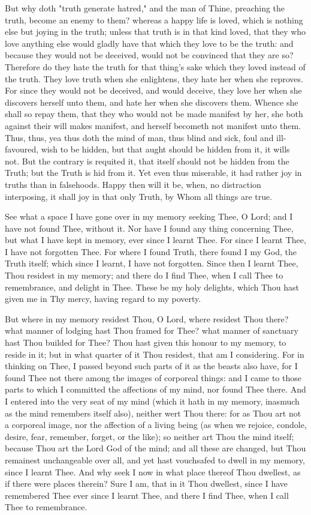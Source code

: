 \documentclass[b5paper,openright,12pt,twoside]{book}
\begin{document}
But why doth "truth generate hatred," and the man of Thine, preaching
the truth, become an enemy to them? whereas a happy life is loved, which
is nothing else but joying in the truth; unless that truth is in that
kind loved, that they who love anything else would gladly have that
which they love to be the truth: and because they would not be deceived,
would not be convinced that they are so? Therefore do they hate the
truth for that thing's sake which they loved instead of the truth. They
love truth when she enlightens, they hate her when she reproves. For
since they would not be deceived, and would deceive, they love her when
she discovers herself unto them, and hate her when she discovers them.
Whence she shall so repay them, that they who would not be made manifest
by her, she both against their will makes manifest, and herself becometh
not manifest unto them. Thus, thus, yea thus doth the mind of man, thus
blind and sick, foul and ill-favoured, wish to be hidden, but that aught
should be hidden from it, it wills not. But the contrary is requited it,
that itself should not be hidden from the Truth; but the Truth is hid
from it. Yet even thus miserable, it had rather joy in truths than in
falsehoods. Happy then will it be, when, no distraction interposing, it
shall joy in that only Truth, by Whom all things are true.

See what a space I have gone over in my memory seeking Thee, O Lord; and
I have not found Thee, without it. Nor have I found any thing concerning
Thee, but what I have kept in memory, ever since I learnt Thee. For
since I learnt Thee, I have not forgotten Thee. For where I found Truth,
there found I my God, the Truth itself; which since I learnt, I have
not forgotten. Since then I learnt Thee, Thou residest in my memory; and
there do I find Thee, when I call Thee to remembrance, and delight in
Thee. These be my holy delights, which Thou hast given me in Thy mercy,
having regard to my poverty.

But where in my memory residest Thou, O Lord, where residest Thou
there? what manner of lodging hast Thou framed for Thee? what manner of
sanctuary hast Thou builded for Thee? Thou hast given this honour to my
memory, to reside in it; but in what quarter of it Thou residest, that
am I considering. For in thinking on Thee, I passed beyond such parts of
it as the beasts also have, for I found Thee not there among the images
of corporeal things: and I came to those parts to which I committed the
affections of my mind, nor found Thee there. And I entered into the
very seat of my mind (which it hath in my memory, inasmuch as the mind
remembers itself also), neither wert Thou there: for as Thou art not
a corporeal image, nor the affection of a living being (as when we
rejoice, condole, desire, fear, remember, forget, or the like); so
neither art Thou the mind itself; because Thou art the Lord God of the
mind; and all these are changed, but Thou remainest unchangeable over
all, and yet hast vouchsafed to dwell in my memory, since I learnt Thee.
And why seek I now in what place thereof Thou dwellest, as if there
were places therein? Sure I am, that in it Thou dwellest, since I have
remembered Thee ever since I learnt Thee, and there I find Thee, when I
call Thee to remembrance.
\end{document}
